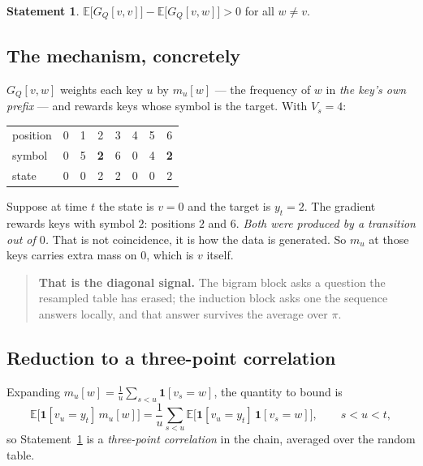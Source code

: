 \documentclass[11pt,a4paper]{article}
\theoremstyle{plain}
\theoremstyle{definition}
\newtheorem{statement}{Statement}
\newcommand{\1}{\mathbf{1}}
\newcommand{\E}{\mathbb{E}}
\begin{document}
\begin{statement}\label{st:b}
$\E\bigl[G_Q[v,v]\bigr]-\E\bigl[G_Q[v,w]\bigr]>0$ for all $w\ne v$.
\end{statement}

\subsection{The mechanism, concretely}

$G_Q[v,w]$ weights each key $u$ by $m_u[w]$ --- the frequency of $w$ in \emph{the key's own
prefix} --- and rewards keys whose symbol is the target. With $V_s=4$:

\begin{center}
\begin{tabular}{@{}lccccccc@{}}
\toprule
position & 0 & 1 & 2 & 3 & 4 & 5 & 6 \\
symbol   & 0 & 5 & \textbf{2} & 6 & 0 & 4 & \textbf{2} \\
state    & 0 & 0 & 2 & 2 & 0 & 0 & 2 \\
\bottomrule
\end{tabular}
\end{center}

Suppose at time $t$ the state is $v=0$ and the target is $y_t=2$. The gradient rewards keys with
symbol $2$: positions $2$ and $6$. \emph{Both were produced by a transition out of $0$.} That is
not coincidence, it is how the data is generated. So $m_u$ at those keys carries extra mass on
$0$, which is $v$ itself.

\begin{quote}
\textbf{That is the diagonal signal.} The bigram block asks a question the resampled table has
erased; the induction block asks one the sequence answers locally, and that answer survives the
average over $\pi$.
\end{quote}

\subsection{Reduction to a three-point correlation}

Expanding $m_u[w]=\frac1u\sum_{s<u}\1[v_s{=}w]$, the quantity to bound is
\begin{equation}
\E\bigl[\1[v_u{=}y_t]\,m_u[w]\bigr]
=\frac1u\sum_{s<u}\E\bigl[\1[v_u{=}y_t]\,\1[v_s{=}w]\bigr],\qquad s<u<t,
\end{equation}
so Statement~\ref{st:b} is a \emph{three-point correlation} in the chain, averaged over the random
table.
\end{document}
